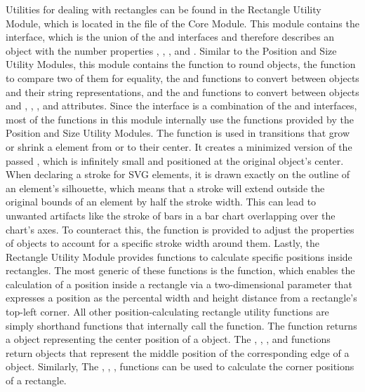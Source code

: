 Utilities for dealing with rectangles can be found in the Rectangle Utility Module, which is located in the  file of the Core Module.
This module contains the  interface, which is the union of the  and  interfaces and therefore describes an object with the number properties , , , and .
Similar to the Position and Size Utility Modules, this module contains the  function to round  objects, the  function to compare two of them for equality, the  and  functions to convert between  objects and their string representations, and the  and  functions to convert between objects and , , , and  attributes.
Since the  interface is a combination of the  and  interfaces, most of the functions in this module internally use the functions provided by the Position and Size Utility Modules.
The  function is used in transitions that grow or shrink a  element from or to their center.
It creates a minimized version of the passed , which is infinitely small and positioned at the original  object's center.
When declaring a stroke for SVG elements, it is drawn exactly on the outline of an element's silhouette, which means that a stroke will extend outside the original bounds of an element by half the stroke width.
This can lead to unwanted artifacts like the stroke of bars in a bar chart overlapping over the chart's axes.
To counteract this, the  function is provided to adjust the properties of  objects to account for a specific stroke width around them.
Lastly, the Rectangle Utility Module provides functions to calculate specific positions inside rectangles.
The most generic of these functions is the  function, which enables the calculation of a position inside a rectangle via a two-dimensional parameter that expresses a position as the percental width and height distance from a rectangle's top-left corner.
All other position-calculating rectangle utility functions are simply shorthand functions that internally call the  function.
The  function returns a  object representing the center position of a  object.
The , , , and  functions return  objects that represent  the middle position of the corresponding edge of a  object.
Similarly, The , , ,  functions can be used to calculate the corner positions of a rectangle.

